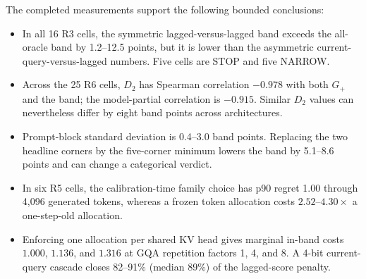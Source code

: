 The completed measurements support the following bounded conclusions:
\begin{itemize}
 \item In all 16 R3 cells, the symmetric lagged-versus-lagged band exceeds the
 all-oracle band by 1.2--12.5 points, but it is lower than the asymmetric
 current-query-versus-lagged numbers.  Five cells are STOP and five NARROW.
 \item Across the 25 R6 cells, $D_2$ has Spearman correlation $-0.978$ with both
 $G_+$ and the band; the model-partial correlation is $-0.915$.  Similar $D_2$
 values can nevertheless differ by eight band points across architectures.
 \item Prompt-block standard deviation is 0.4--3.0 band points.  Replacing the
 two headline corners by the five-corner minimum lowers the band by 5.1--8.6
 points and can change a categorical verdict.
 \item In six R5 cells, the calibration-time family choice has p90 regret 1.00
 through 4,096 generated tokens, whereas a frozen token allocation costs
 $2.52$--$4.30\times$ a one-step-old allocation.
 \item Enforcing one allocation per shared KV head gives marginal in-band costs
 $1.000$, $1.136$, and $1.316$ at GQA repetition factors 1, 4, and 8.  A 4-bit
 current-query cascade closes 82--91\% (median 89\%) of the lagged-score penalty.
\end{itemize}

\begin{table}[h]
\centering
\small
\caption{Predictor comparison on the 25 regime-map cells (\S\ref{sec:regimes}).  Columns: pooled Spearman correlation with $\gplus$; the same partialled on model identity; leave-one-model-out error of a log-linear fit of $\gplus$, as a multiplicative factor; mean Spearman within the held-out model.  All predictors are cell medians of per-head medians on the rows that define $D_2$; the recomputed $D_2$ matches the reported one to within 0.52 points in every cell.  The heterogeneity statistic is the spread of $\tfrac12\log_2 w_i$; for log-normal $w$ it ranks cells as the AM/GM ratio does.}
\label{tab:app-predictors}

\end{table}

